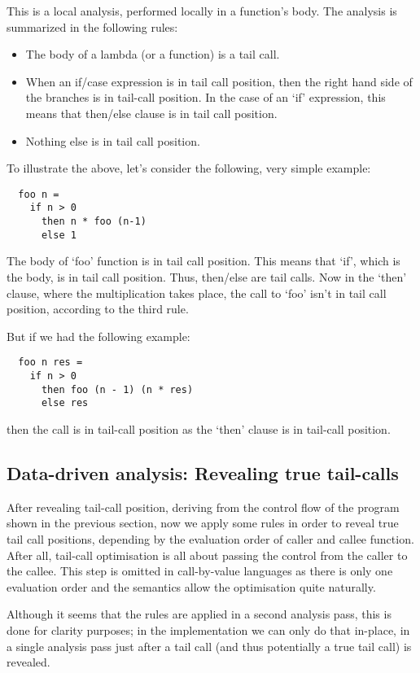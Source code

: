 \documentclass[diploma]{softlab-thesis}
\begin{document}
This is a local analysis, performed locally in a function's body. The analysis is summarized in the following rules:
\begin{itemize}
  \item The body of a lambda (or a function) is a tail call.
  \item When an if/case expression is in tail call position, then the right hand side of the branches is in tail-call position. 
  In the case of an `if' expression, this means that then/else clause is in tail call position.
  \item Nothing else is in tail call position.
\end{itemize}

To illustrate the above, let's consider the following, very simple example:
\begin{verbatim}
  foo n = 
    if n > 0  
      then n * foo (n-1) 
      else 1
\end{verbatim}

The body of `foo' function is in tail call position. This means that `if', which is the body, is in tail call position. 
Thus, then/else are tail calls. Now in the `then' clause, where the multiplication takes place, the call to `foo' isn't in tail call position, 
according to the third rule.

But if we had the following example:
\begin{verbatim}
  foo n res = 
    if n > 0 
      then foo (n - 1) (n * res)
      else res
\end{verbatim}
then the call is in tail-call position as the `then' clause is in tail-call position.

\subsection{Data-driven analysis: Revealing true tail-calls}

After revealing tail-call position, deriving from the control flow of the program shown in the previous section, now we apply some rules in order to 
reveal true tail call positions, depending by the evaluation order of caller and callee function. After all, tail-call optimisation 
is all about passing the control from the caller to the callee. This step is omitted in call-by-value languages as there is 
only one evaluation order and the semantics allow the optimisation quite naturally.

Although it seems that the rules are applied in a second analysis pass, this is done for clarity purposes; in the implementation we can 
only do that in-place, in a single analysis pass just after a tail call (and thus potentially a true tail call) is revealed.
\end{document}
